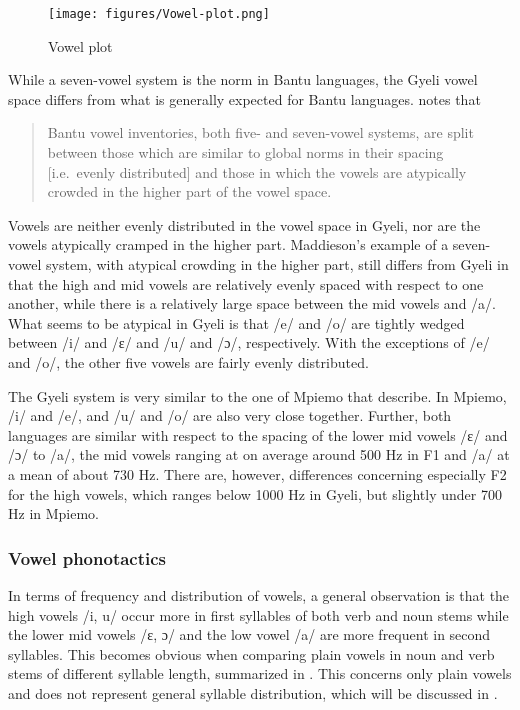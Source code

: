 \begin{figure}
\texttt{[image: figures/Vowel-plot.png]}
\caption{Vowel plot}
\label{Fig:plot}
\end{figure}

While a seven-vowel system is the norm in Bantu languages, the Gyeli vowel space differs from what is generally expected for Bantu languages. \citet[18]{maddieson2003a} notes that 
\begin{quote}
Bantu vowel inventories, both five- and seven-vowel systems, are split between those which are similar to global norms in their spacing [i.e.\ evenly distributed] and those in which the vowels are atypically crowded in the higher part of the vowel space.
\end{quote}
Vowels are neither evenly distributed in the vowel space in Gyeli, nor are the vowels atypically cramped in the higher part. Maddieson's example of a seven-vowel system, with atypical crowding in the higher part, still differs from Gyeli in that the high and mid vowels are relatively evenly spaced with respect to one another, while there is a relatively large space between the mid vowels and /a/. What seems to be atypical in Gyeli is that /e/ and /o/ are tightly wedged between /i/ and /ɛ/ and /u/ and /ɔ/, respectively. With the exceptions of /e/ and /o/, the other five vowels are fairly evenly distributed.

 The Gyeli system is very similar to the one of Mpiemo that \citet[167]{thornell2004} describe. In Mpiemo, /i/ and /e/, and /u/ and /o/ are also very close together. Further, both languages are similar with respect to the spacing of the lower mid vowels /ɛ/ and /ɔ/ to /a/, the mid vowels ranging at on average around 500 Hz in F1 and /a/ at a mean of about 730 Hz. There are, however, differences concerning especially F2 for the high vowels, which ranges below 1000 Hz in Gyeli, but slightly under 700 Hz in Mpiemo. 


\subsubsection{Vowel phonotactics} 

In terms of frequency and distribution of vowels, a general observation is that the high vowels /i, u/ occur more in first syllables of both verb and noun stems while the lower mid vowels /ɛ, ɔ/ and the low vowel /a/ are more frequent in second syllables. This becomes obvious when comparing plain vowels in noun and verb stems of different syllable length, summarized in . This concerns only plain vowels and does not represent general syllable distribution, which will be discussed in .


